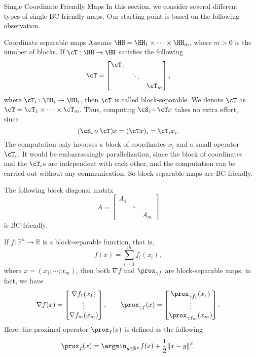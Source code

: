 \begin{section}{Single Coordinate Friendly Maps}
In this section, we consider several different types of single BC-friendly maps. Our starting point is based on the following observation. 
\begin{subsection}{Coordinate separable maps}
Assume $\HH = \HH_1 \times \cdots \times \HH_m$, where $m > 0 $ is the number of blocks. If $\cT: \HH \rightarrow \HH$ satisfies the following
$$\cT = \begin{bmatrix}\cT_1 & & \\ & \ddots& \\ & & \cT_m\end{bmatrix},$$
where $\cT_i: \HH_i \rightarrow \HH_i$, then $\cT$ is called block-separable. We denote $\cT$ as $\cT=\cT_{1}\times\cdots\times \cT_{m}$. Thus, computing $\cS_i \circ \cT x$ takes no extra effort, since
$$(\cS_i \circ \cT) x = (\cT x)_i = \cT_i x_i.$$
The computation only involves a block of coordinates $x_i$ and a small operator $\cT_i$.  It would be embarrassingly parallelization, since the block of coordinates and the $\cT_i$s are independent with each other, and the computation can be carried out without any communication. So block-separable maps are BC-friendly.
\end{subsection}
\begin{example}
The following block diagonal matrix 
$$A = \begin{bmatrix}A_1 & & \\ & \ddots& \\ & & A_m\end{bmatrix}$$
is BC-friendly.
\end{example}

\begin{example}
If $f: \mathbb{R}^n \rightarrow \mathbb{R}$ is a block-separable function, that is, 
$$f(x) = \sum_{i=1}^m f_i(x_i),$$
where $x = (x_1; \cdots; x_m)$, then both $\nabla f$ and $\prox_{\gamma f}$ are block-separable maps, in fact, we have
$$\nabla f(x) = \begin{bmatrix} \nabla f_1 (x_1) \\ \vdots \\ \nabla f_m(x_m) \end{bmatrix}, \qquad \prox_{\gamma f}(x) = \begin{bmatrix}  \prox_{\gamma f_1} (x_1) \\ \vdots \\  \prox_{\gamma f_m}(x_m) \end{bmatrix}.$$
Here, the proximal operator $\prox_{f} (x)$ is defined as the following
$$\prox_{f} (x) = \argmin_{y \in \mathbb{R}^n} f(x) + \frac{1}{2} \|x - y\|^2.$$
\end{example}


\end{section}
